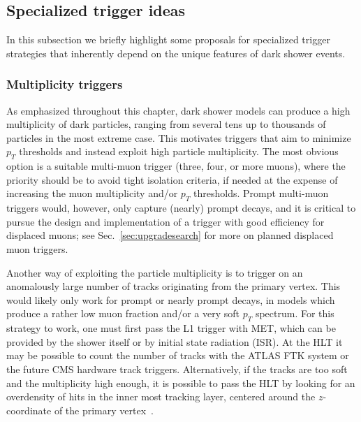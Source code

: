 \subsection{Specialized trigger ideas}

In this subsection we briefly highlight some proposals for specialized trigger strategies that inherently depend on the unique features of dark shower events.


\subsubsection{Multiplicity triggers}
\label{sec:darkshowertrigmultiplicity}

As emphasized  throughout this chapter, dark shower models can produce a high multiplicity of dark particles, ranging from several tens up to thousands of particles in the most extreme case. This motivates triggers that aim to minimize $p_T$ thresholds and instead exploit high particle multiplicity. The most obvious option is a suitable multi-muon trigger (three, four, or more muons), where the priority should be to avoid tight isolation criteria, if needed at the expense of increasing the muon multiplicity and/or $p_T$ thresholds. Prompt multi-muon triggers would, however, only capture (nearly) prompt decays, and it is critical to pursue the design and implementation of a trigger with good efficiency for displaced muons; see Sec.~\ref{sec:upgradesearch} for more on planned displaced muon triggers.

Another way of exploiting the particle multiplicity is to trigger on an anomalously large number of tracks originating from the primary vertex. This would likely only work for prompt or nearly prompt decays, in models which produce a rather low muon fraction and/or a very soft $p_T$ spectrum. For this strategy to work, one must first pass the L1 trigger with MET, which can be provided by the shower itself or by initial state radiation (ISR). At the HLT it may be possible to count the number of tracks with the ATLAS FTK system or the future CMS hardware track triggers. Alternatively, if the tracks are too soft and the multiplicity high enough, it is possible to pass the HLT  by looking for an overdensity of hits in the inner most tracking layer, centered around the $z$-coordinate of the primary vertex~\cite{Knapen:2016hky}.

